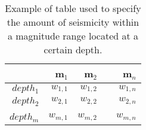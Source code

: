 \begin{table}[!t]
\centering
\begin{tabular}{rrrrr} 
\hline
  	      & m$_1$ & m$_2$  &  & m$_n$ \\
\hline
$depth_1$ & $w_{1,1}$      & $w_{1,2}$      &  & $w_{1,n}$ \\
$depth_2$ & $w_{2,1}$      & $w_{2,2}$      &  & $w_{2,n}$ \\
          &                &                &  & \\
$depth_m$ & $w_{m,1}$      & $w_{m,2}$      &  & $w_{m,n}$ \\
\hline
\end{tabular}
\caption{Example of table used to specify the amount of seismicity within 
a magnitude range located at a certain depth.}
\label{tab:multi-depth_example}
\end{table}